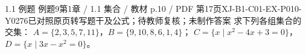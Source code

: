 \par\noindent\begin{minipage}{\linewidth}
\begin{bankitem}{1.1 例题 例题9}{第1章 / 1.1 集合 / 教材 p.10 / PDF 第17页}{XJ-B1-C01-EX-P010-Y0276}{已对照原页转写题干及公式；待教师复核；未制作答案}
求下列各组集合的交集：
$A=\{2,3,5,7,11\}$，$B=\{9,10,8,6,1,4\}$；
$C=\{x\mid x^2-4x+3=0\}$，$D=\{x\mid3x-x^2=0\}$。
\end{bankitem}
\end{minipage}\par\medskip
